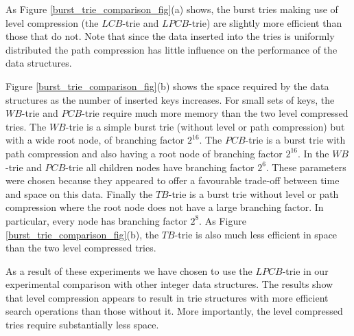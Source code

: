 \documentclass[]{acmtrans2m}
\begin{document}
As Figure \ref{burst_trie_comparison_fig}(a) shows, the burst tries making use of level compression (the $LCB$-trie and $LPCB$-trie) are slightly more efficient than those that do not. 
Note that since the data inserted into the tries is uniformly distributed the path compression has little influence on the performance of the data structures. 

Figure \ref{burst_trie_comparison_fig}(b)
shows the space required by the data structures as the number of inserted keys increases. For small sets of keys, the $WB$-trie and $PCB$-trie require much more memory than
the two level compressed tries. The $WB$-trie is a simple burst trie (without level or path compression) but with a wide root node, of branching factor $2^{16}$. The $PCB$-trie
is a burst trie with path compression and also having a root node of branching factor $2^{16}$. In the $WB$-trie and $PCB$-trie all children nodes have branching factor $2^6$.
These parameters were chosen because they appeared to offer a favourable trade-off between time and space on this data. Finally the $TB$-trie is a burst trie without level
or path compression where the root node does not have a large branching factor. In particular, every node has branching factor $2^8$. As Figure \ref{burst_trie_comparison_fig}(b), the $TB$-trie is also much
less efficient in space than the two level compressed tries.

As a result of these experiments we have chosen to use the $LPCB$-trie in our experimental comparison with other integer data structures.
The results show that level compression appears to result in trie structures with more efficient search operations than those without it. More importantly, the level compressed
tries require substantially less space. 
\end{document}
